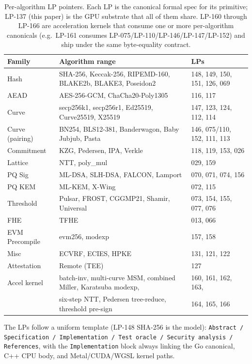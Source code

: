 \begin{table}[H]
\centering
\small
\begin{tabular}{lll}
\toprule
\textbf{Family} & \textbf{Algorithm range} & \textbf{LPs}\\
\midrule
Hash                & SHA-256, Keccak-256, RIPEMD-160, BLAKE2b, BLAKE3, Poseidon2 & 148, 149, 150, 151, 126, 069 \\
AEAD                & AES-256-GCM, ChaCha20-Poly1305 & 116, 117 \\
Curve               & secp256k1, secp256r1, Ed25519, Curve25519, X25519 & 147, 123, 124, 112, 114 \\
Curve (pairing)     & BN254, BLS12-381, Banderwagon, Baby Jubjub, Pasta & 146, 075/110, 152, 111, 113 \\
Commitment          & KZG, Pedersen, IPA, Verkle & 118, 119, 153, 026 \\
Lattice             & NTT, poly\_mul & 029, 159 \\
PQ Sig              & ML-DSA, SLH-DSA, FALCON, Lamport & 070, 071, 074, 156 \\
PQ KEM              & ML-KEM, X-Wing & 072, 115 \\
Threshold           & Pulsar, FROST, CGGMP21, Shamir, Universal & 073, 154, 155, 077, 076 \\
FHE                 & TFHE & 013, 066 \\
EVM Precompile      & evm256, modexp & 157, 158 \\
Misc                & ECVRF, ECIES, HPKE & 131, 121, 122 \\
Attestation         & Remote (TEE) & 127 \\
\midrule
Accel kernel        & batch-inv, multi-curve MSM, combined Miller, Karatsuba modexp, & 160, 161, 162, 163, \\
                    & six-step NTT, Pedersen tree-reduce, threshold pre-sign & 164, 165, 166 \\
\bottomrule
\end{tabular}
\caption{Per-algorithm LP pointers. Each LP is the canonical formal spec for its primitive; LP-137 (this paper) is the GPU substrate that all of them share. LP-160 through LP-166 \cite{lp160,lp161,lp162,lp163,lp164,lp165,lp166} are acceleration kernels that consume one or more per-algorithm canonicals (e.g.\ LP-161 consumes LP-075/LP-110/LP-146/LP-147/LP-152) and ship under the same byte-equality contract.}
\label{tab:lp-pointers}
\end{table}

The LPs follow a uniform template (LP-148 SHA-256 \cite{fips180} is the model): \texttt{Abstract / Specification / Implementation / Test oracle / Security analysis / References}, with the \texttt{Implementation} block always linking the Go canonical, C++ CPU body, and Metal/CUDA/WGSL kernel paths.
